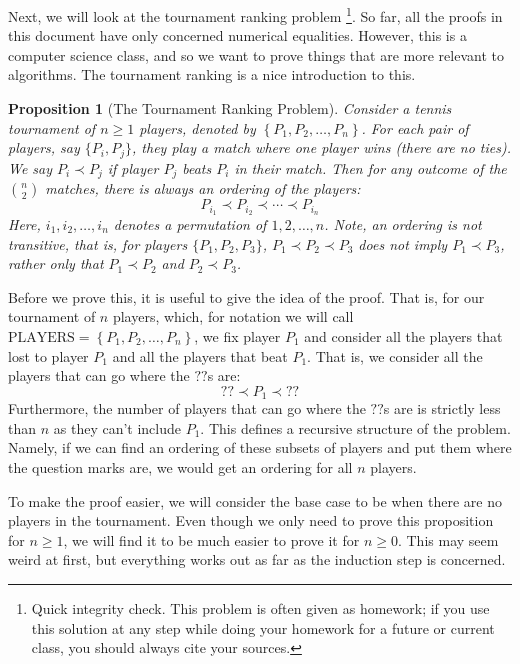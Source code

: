 \documentclass{article}
\theoremstyle{plain}
\newtheorem{proposition}{Proposition}
\theoremstyle{definition}
\begin{document}
\phantom{abc}

Next, we will look at the tournament ranking problem 
\footnote{Quick integrity check. This problem is often given as homework; if you use this solution at any step while doing your homework for a future or current class, you should always cite your sources.}.
So far, all the proofs in this document have only concerned numerical equalities. However, this is a computer science class, and so we want to prove things that are more relevant to algorithms. The tournament ranking is a nice introduction to this.

\begin{proposition}[The Tournament Ranking Problem]
    Consider a tennis tournament of \(n \geq 1\) players, denoted by \(\left\{P_1, P_2, \dotsc, P_n\right\}\). For each pair of players, say \(\{P_i, P_j\}\), they play a match where one player wins (there are no ties). We say \(P_i \prec P_j\) if player \(P_j\) beats \(P_i\) in their match. Then for any outcome of the \(\binom{n}{2}\) matches, there is always an ordering of the players:
    \[P_{i_1} \prec P_{i_2} \prec \cdots \prec P_{i_n}\]
    Here, \(i_1, i_2, \dotsc, i_n\) denotes a permutation of \(1, 2, \dotsc, n\). Note, an ordering is \emph{not} transitive, that is, for players \(\{P_1, P_2, P_3\}\), \(P_1 \prec P_2 \prec P_3\) does \emph{not} imply \(P_1 \prec P_3\), rather only that \(P_1 \prec P_2\) and \(P_2 \prec P_3\).
\end{proposition}

\phantom{ignore me}

Before we prove this, it is useful to give the idea of the proof. That is, for our tournament of \(n\) players, which, for notation we will call \(\text{PLAYERS} = \left\{P_1, P_2, \dotsc, P_n\right\}\), we fix player \(P_1\) and consider all the players that lost to player \(P_1\) and all the players that beat \(P_1\). That is, we consider all the players that can go where the \(??\)s are:
\[?? \prec P_1 \prec ??\]
Furthermore, the number of players that can go where the \(??\)s are is strictly less than \(n\) as they can't include \(P_1\). This defines a recursive structure of the problem. Namely, if we can find an ordering of these subsets of players and put them where the question marks are, we would get an ordering for all \(n\) players.

To make the proof easier, we will consider the base case to be when there are no players in the tournament. Even though we only need to prove this proposition for \(n \geq 1\), we will find it to be much easier to prove it for \(n \geq 0\). This may seem weird at first, but everything works out as far as the induction step is concerned.
\end{document}
